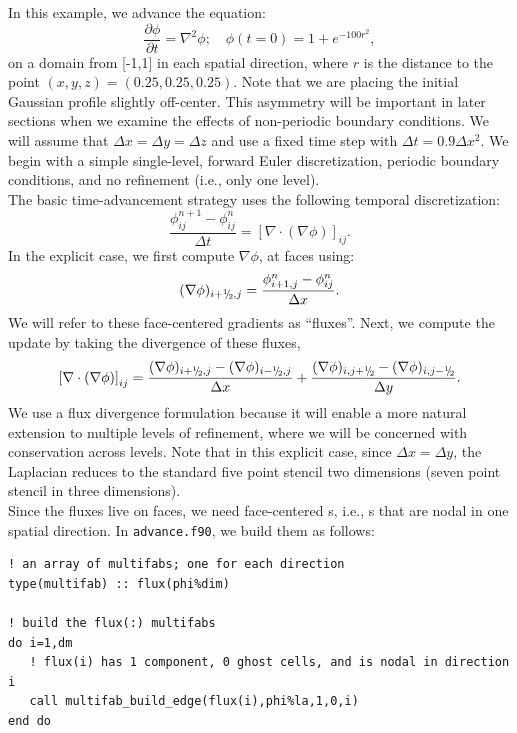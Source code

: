 In this example, we advance the equation:
\begin{equation}
\frac{\partial\phi}{\partial t} = \nabla^2 \phi; \quad \phi(t=0) = 1 + e^{-100r^2},
\end{equation}
on a domain from [-1,1] in each spatial direction, where $r$ is the distance
to the point $(x,y,z) = (0.25,0.25,0.25)$.  Note that we are placing the
initial Gaussian profile slightly off-center.  This asymmetry will be important
in later sections when we examine the effects of non-periodic boundary conditions.
We will assume that $\Delta x = \Delta y = \Delta z$ and use a fixed
time step with $\Delta t = 0.9\Delta x^2$.  We begin with a simple 
single-level, forward Euler discretization, periodic boundary conditions,
and no refinement (i.e., only one level).\\

The basic time-advancement strategy uses the following temporal discretization:
\begin{equation}
\frac{\phi_{ij}^{n+1} - \phi_{ij}^n}{\Delta t} = \left[\nabla\cdot(\nabla\phi)\right]_{ij}.
\end{equation}
In the explicit case, we first compute $\nabla\phi$, at faces using:
\begin{equation}
(\nabla\phi)_{i+\myhalf,j} = \frac{\phi_{i+1,j}^n-\phi_{ij}^n}{\Delta x}.
\end{equation}
We will refer to these face-centered gradients as ``fluxes''.
Next, we compute the update by taking the divergence of these fluxes,
\begin{equation}
\left[\nabla\cdot(\nabla\phi)\right]_{ij} = \frac{(\nabla\phi)_{i+\myhalf,j}-(\nabla\phi)_{i-\myhalf,j}}{\Delta x} + \frac{(\nabla\phi)_{i,j+\myhalf}-(\nabla\phi)_{i,j-\myhalf}}{\Delta y}.
\end{equation}
We use a flux divergence formulation because it will enable a more natural 
extension to multiple levels of refinement, where we will be concerned with
conservation across levels.  Note that in this explicit case, since $\Delta x = \Delta y$, 
the Laplacian reduces to the standard five point stencil two dimensions
(seven point stencil in three dimensions).\\

Since the fluxes live on faces, we need face-centered \MultiFab s, i.e.,
\MultiFab s that are nodal in one spatial direction.  In {\tt advance.f90},
we build them as follows:
\begin{lstlisting}[backgroundcolor=\color{light-green}]
! an array of multifabs; one for each direction
type(multifab) :: flux(phi%dim) 

! build the flux(:) multifabs
do i=1,dm
   ! flux(i) has 1 component, 0 ghost cells, and is nodal in direction i
   call multifab_build_edge(flux(i),phi%la,1,0,i)
end do
\end{lstlisting}

